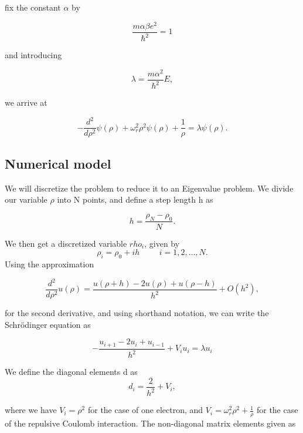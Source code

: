 \documentclass{emulateapj}
\begin{document}
fix the constant $\alpha$ by

\begin{equation}
\frac{m\alpha \beta e^2}{\hbar^2}=1
\end{equation}

and introducing

\begin{equation}
\lambda = \frac{m\alpha^2}{\hbar^2}E,
\end{equation}

we arrive at

\begin{equation}
  -\frac{d^2}{d\rho^2} \psi(\rho) + \omega_r^2\rho^2\psi(\rho) +\frac{1}{\rho} = \lambda \psi(\rho).
\end{equation}

\subsection{Numerical model}
We will discretize the problem to reduce it to an Eigenvalue problem. We divide our variable $\rho$ into N points, and define a step length h as

\begin{equation}
  h=\frac{\rho_N-\rho_0 }{N}.
\end{equation}

We then get a discretized variable $rho_i$, given by
\[
    \rho_i= \rho_0 + ih \hspace{1cm} i=1,2,\dots , N.
\]
Using the approximation

\begin{equation}
    \frac{d^2}{d\rho^2} u(\rho) =\frac{u(\rho+h) -2u(\rho) +u(\rho-h)}{h^2} +O(h^2),
    \label{eq:diffoperation}
\end{equation}

for the second derivative, and using shorthand notation, we can write the Schrödinger equation as

\begin{equation}
-\frac{u_{i+1} -2u_i +u_{i-1} }{h^2}+V_iu_i  = \lambda u_i
\end{equation}

We define the diagonal elements d as
\begin{equation}
   d_i=\frac{2}{h^2}+V_i,
\end{equation}

where we have $V_i = \rho^2$ for the case of one electron, and $V_i = \omega_r^2 \rho^2 + \frac{1}{\rho}$ for the case of the repulsive Coulomb interaction. The non-diagonal matrix elements given as
\end{document}
